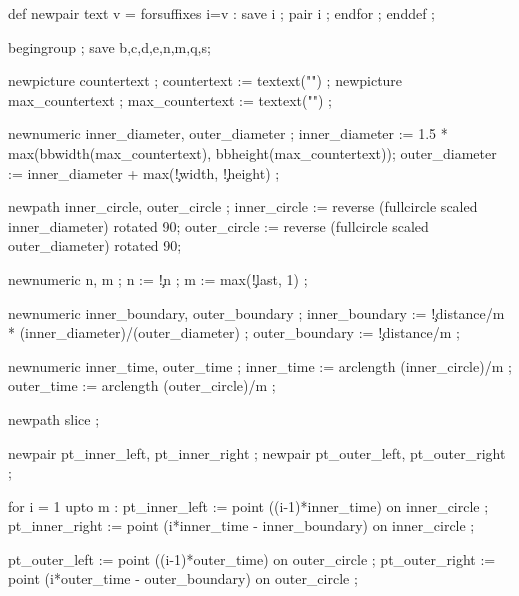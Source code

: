 

\startMPdefinitions
  def newpair    text v = forsuffixes i=v : save i ; pair    i ; endfor ; enddef ;
\stopMPdefinitions

  begingroup ;
  save b,c,d,e,n,m,q,s;

  newpicture countertext     ; countertext     := textext("\getvisualcountertext")    ;
  newpicture max_countertext ; max_countertext := textext("\getmaxvisualcountertext") ;

  newnumeric inner_diameter, outer_diameter ;
  inner_diameter := 1.5 * max(bbwidth(max_countertext), bbheight(max_countertext));
  outer_diameter := inner_diameter + 
          max(\visualcounterparameter\c!width, \visualcounterparameter\c!height) ;

  newpath inner_circle, outer_circle ;
  inner_circle := reverse (fullcircle scaled inner_diameter) rotated 90;
  outer_circle := reverse (fullcircle scaled outer_diameter) rotated 90;

  newnumeric n, m ;
  n := \visualcounterparameter\c!n ;
  m := max(\visualcounterparameter\c!last, 1) ;

  newnumeric inner_boundary, outer_boundary ;
  inner_boundary := \visualcounterparameter\c!distance/m * (inner_diameter)/(outer_diameter) ;
  outer_boundary := \visualcounterparameter\c!distance/m ;

  newnumeric inner_time, outer_time ;
  inner_time := arclength (inner_circle)/m ;
  outer_time := arclength (outer_circle)/m ;

  newpath slice ;

  newpair pt_inner_left, pt_inner_right ;
  newpair pt_outer_left, pt_outer_right ;

  for i = 1 upto m : 
    pt_inner_left  := point ((i-1)*inner_time)               on inner_circle ;
    pt_inner_right := point (i*inner_time - inner_boundary)  on inner_circle ;

    pt_outer_left  := point ((i-1)*outer_time)               on outer_circle ;
    pt_outer_right := point (i*outer_time - outer_boundary)  on outer_circle ;

